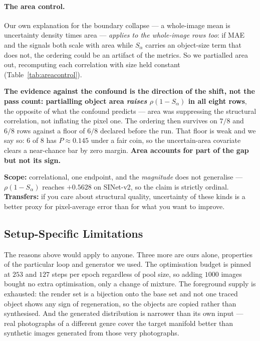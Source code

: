 \documentclass{article} %
\begin{document}
\paragraph{The area control.} Our own explanation for the boundary collapse --- a whole-image mean is
uncertainty density times area --- \emph{applies to the whole-image rows too}: if MAE and the signals
both scale with area while $S_\alpha$ carries an object-size term that does not, the ordering could
be an artifact of the metrics. So we partialled area out, recomputing each correlation with size
held constant (Table~\ref{tab:areacontrol}).

\textbf{The evidence against the confound is the direction of the shift, not the pass count:
partialling object area \emph{raises} $\rho(1-S_\alpha)$ in all eight rows}, the opposite of what the
confound predicts --- area was suppressing the structural correlation, not inflating the pixel one.
The ordering then survives on $7/8$ and $6/8$ rows against a floor of $6/8$ declared before the run.
That floor is weak and we say so: $6$ of $8$ has $P \approx 0.145$ under a fair coin, so the
uncertain-area covariate clears a near-chance bar by zero margin. \textbf{Area accounts for part of
the gap but not its sign.}

\textbf{Scope:} correlational, one endpoint, and the \emph{magnitude} does not generalise ---
$\rho(1-S_\alpha)$ reaches $+0.5628$ on SINet-v2, so the claim is strictly ordinal.
\textbf{Transfers:} if you care about structural quality, uncertainty of these kinds is a better
proxy for pixel-average error than for what you want to improve.

\subsection{Setup-Specific Limitations}
\label{sec:diss-instantiation}

The reasons above would apply to anyone. Three more are ours alone, properties of the particular loop
and generator we used. The optimisation budget is pinned at $253$ and $127$ steps per epoch
regardless of pool size, so adding $1000$ images bought no extra optimisation, only a change of
mixture. The foreground supply is exhausted: the render set is a bijection onto the base set and not
one traced object shows any sign of regeneration, so the objects are copied rather than synthesised.
And the generated distribution is narrower than its own input --- real photographs of a different
genre cover the target manifold better than synthetic images generated from those very
photographs.
\end{document}
